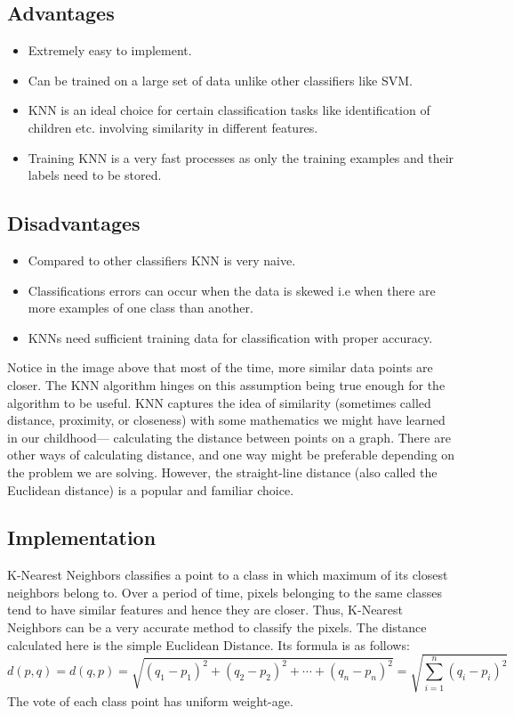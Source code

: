 \documentclass[12pt, a4paper]{report}
\begin{document}
\subsection{Advantages}
\begin{itemize}
\item Extremely easy to implement.
\item Can be trained on a large set of data unlike other classifiers like SVM.
\item KNN is an ideal choice for certain classification tasks like identification of children etc. involving similarity in different features.
\item Training KNN is a very fast processes as only the training examples and their labels need to be stored.
\end{itemize}

\subsection{Disadvantages}
\begin{itemize}
\item Compared to other classifiers KNN is very naive.
\item Classifications errors can occur when the data is skewed i.e when there are more examples of one class than another.
\item KNNs need sufficient training data for classification with proper accuracy.
\end{itemize}
Notice in the image above that most of the time, more similar data points are closer. The KNN algorithm hinges on this assumption being true enough for the algorithm to be useful. KNN captures the idea of similarity (sometimes called distance, proximity, or closeness) with some mathematics we might have learned in our childhood— calculating the distance between points on a graph. There are other ways of calculating distance, and one way might be preferable depending on the problem we are solving. However, the straight-line distance (also called the Euclidean distance) is a popular and familiar choice.

\subsection{Implementation}
K-Nearest Neighbors  classifies a point to a class in which maximum of its closest neighbors belong to. Over a period of time, pixels belonging to the same classes tend to have similar features and hence they are closer. Thus, K-Nearest Neighbors can be a very accurate method to classify the pixels. The distance calculated here is the simple Euclidean Distance. Its formula is as follows:
\begin{displaymath}
d(p, q)=d(q, p)=\sqrt{(q_1-p_1)^2+(q_2-p_2)^2+\cdots+(q_n-p_n)^2}=\sqrt{\sum_{i=1}^{n}(q_i-p_i)^2}
\end{displaymath}
The vote of each class point has uniform weight-age.
\end{document}
